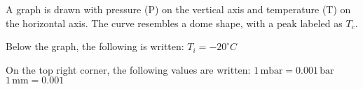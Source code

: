 A graph is drawn with pressure (P) on the vertical axis and temperature (T) on the horizontal axis. The curve resembles a dome shape, with a peak labeled as \( T_c \).  

Below the graph, the following is written:  
\( T_i = -20^\circ C \)  

On the top right corner, the following values are written:  
\( 1 \, \text{mbar} = 0.001 \, \text{bar} \)  
\( 1 \, \text{mm} = 0.001 \)